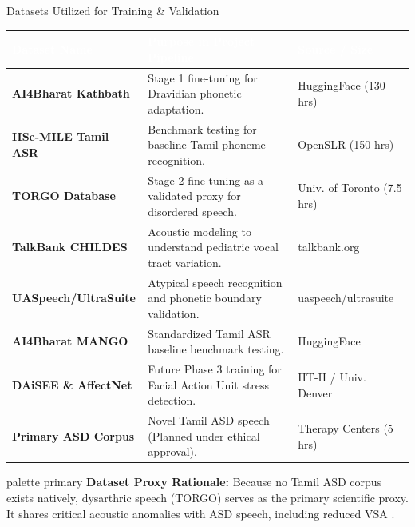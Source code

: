 \documentclass[aspectratio=169, 11pt, xcolor=table]{beamer}
\begin{document}
\begin{frame}{Datasets Utilized for Training \& Validation}
    \vspace{-0.8mm}
    \centering
    \scriptsize
    \renewcommand{\arraystretch}{1.3}
    \begin{tabularx}{\textwidth}{|>{}l|L|L|}
        \hline
        \textcolor{white}{\textbf{Dataset Name}} & \textcolor{white}{\textbf{Purpose in Project Pipeline}} & \textcolor{white}{\textbf{Source / Size}} \\
        \hline
        \textbf{AI4Bharat Kathbath} & Stage 1 fine-tuning for Dravidian phonetic adaptation. & HuggingFace (130 hrs) \\
        \hline
        \textbf{IISc-MILE Tamil ASR} & Benchmark testing for baseline Tamil phoneme recognition. & OpenSLR (150 hrs) \\
        \hline
        \textbf{TORGO Database} & Stage 2 fine-tuning as a validated proxy for disordered speech. & Univ. of Toronto (7.5 hrs) \\
        \hline
        \textbf{TalkBank CHILDES} & Acoustic modeling to understand pediatric vocal tract variation. & talkbank.org \\
        \hline
        \textbf{UASpeech/UltraSuite} & Atypical speech recognition and phonetic boundary validation. & uaspeech/ultrasuite \\
        \hline
        \textbf{AI4Bharat MANGO} & Standardized Tamil ASR baseline benchmark testing. & HuggingFace \\
        \hline
        \textbf{DAiSEE \& AffectNet} & Future Phase 3 training for Facial Action Unit stress detection. & IIT-H / Univ. Denver \\
        \hline
        \textbf{Primary ASD Corpus} & Novel Tamil ASD speech (Planned under ethical approval). & Therapy Centers (5 hrs) \\
        \hline
    \end{tabularx}
    
    \vspace{0.09mm}
    \begin{beamercolorbox}[sep=2pt, left, rounded=true]{palette primary}
        \scriptsize \textbf{Dataset Proxy Rationale:} Because no Tamil ASD corpus exists natively, dysarthric speech (TORGO) serves as the primary scientific proxy. It shares critical acoustic anomalies with ASD speech, including reduced VSA .
    \end{beamercolorbox}
\end{frame}
\end{document}
